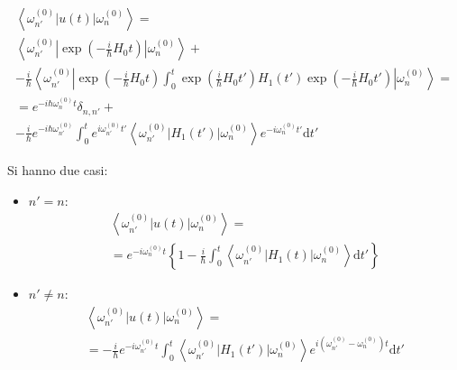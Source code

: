 \begin{equation}\begin{split}
\left\langle \omega _{n'}^{\left(0\right)}\left|u\left(t\right)\right|\omega _n^{\left(0\right)} \right\rangle=\\
\left\langle \omega _{n'}^{\left(0\right)}\left|\exp{\left(-\frac{i}{\hbar }H_0t\right)}\right|\omega _n^{\left(0\right)} \right\rangle+\\
-\frac{i}{\hbar }\left\langle \omega _{n'}^{\left(0\right)}\left|\exp{\left(-\frac{i}{\hbar }H_0t\right)}\int_0^t{\exp{\left(\frac{i}{\hbar }H_0t'\right)}H_1\left(t'\right)\exp{\left(-\frac{i}{\hbar }H_0t'\right)}}\right|\omega _n^{\left(0\right)} \right\rangle=\\
=e^{-i\hbar \omega _n^{\left(0\right)}t}\delta_{n,n'}+\\
-\frac{i}{\hbar }e^{-i\hbar \omega _{n'}^{\left(0\right)}}\int_0^t{e^{i\omega _{n'}^{\left(0\right)}t'}\left\langle \omega _{n'}^{\left(0\right)}\left|H_1\left(t'\right)\right|\omega _n^{\left(0\right)} \right\rangle e^{-i\omega _n^{\left(0\right)}t'}\textrm{d}t'}
\end{split}\end{equation}

Si hanno due casi:
\begin{itemize}
\item $n'=n$:
\begin{equation}\begin{split}
\left\langle \omega _{n'}^{\left(0\right)}|u\left(t\right)|\omega _n^{\left(0\right)} \right\rangle=\\
=e^{-i\omega _n^{\left(0\right)}t}\left\{1-\frac{i}{\hbar }\int_0^t{\left\langle \omega _{n'}^{\left(0\right)}\left|H_1\left(t\right)\right|\omega _n^{\left(0\right)} \right\rangle\textrm{d}t'}\right\}
\end{split}\end{equation}

\item $n'\neq n$:
\begin{equation}\begin{split}
\left\langle \omega _{n'}^{\left(0\right)}|u\left(t\right)|\omega _n^{\left(0\right)} \right\rangle=\\
=-\frac{i}{\hbar }e^{-i\omega _{n'}^{\left(0\right)}t}\int_0^t{\left\langle \omega _{n'}^{\left(0\right)}|H_1\left(t'\right)|\omega _n^{\left(0\right)} \right\rangle e^{i\left(\omega _{n'}^{\left(0\right)}-\omega _n^{\left(0\right)}\right)t}\textrm{d}t'}
\end{split}\end{equation}
\end{itemize}

